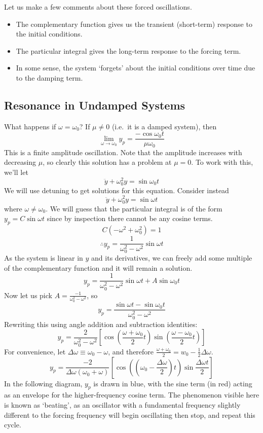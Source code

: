 \noindent Let us make a few comments about these forced oscillations.
\begin{itemize}
	\item The complementary function gives us the transient (short-term) response to the initial conditions.
	\item The particular integral gives the long-term response to the forcing term.
	\item In some sense, the system `forgets' about the initial conditions over time due to the damping term.
\end{itemize}

\subsection{Resonance in Undamped Systems}
What happens if \(\omega = \omega_0\)? If \(\mu \neq 0\) (i.e.\ it is a damped system), then
\[
	\lim_{\omega \to \omega_0} y_p = \frac{-\cos\omega_0 t}{\mu\omega_0}
\]
This is a finite amplitude oscillation.
Note that the amplitude increases with decreasing \(\mu\), so clearly this solution has a problem at \(\mu = 0\).
To work with this, we'll let
\[
	\ddot y + \omega_0^2 y = \sin\omega_0 t
\]
We will use detuning to get solutions for this equation.
Consider instead
\[
	\ddot y + \omega_0^2 y = \sin\omega t
\]
where \(\omega \neq \omega_0\).
We will guess that the particular integral is of the form \(y_p = C\sin\omega t\) since by inspection there cannot be any cosine terms.
\[
	C(-\omega^2 + \omega_0^2) = 1
\]
\[
	\therefore y_p = \frac{1}{\omega_0^2 - \omega^2}\sin\omega t
\]
As the system is linear in \(y\) and its derivatives, we can freely add some multiple of the complementary function and it will remain a solution.
\[
	y_p = \frac{1}{\omega_0^2 - \omega^2}\sin\omega t + A \sin\omega_0 t
\]
Now let us pick \(A = \frac{-1}{\omega_0^2 - \omega^2}\), so
\[
	y_p = \frac{\sin \omega t - \sin \omega_0 t}{\omega_0^2 - \omega^2}
\]
Rewriting this using angle addition and subtraction identities:
\[
	y_p = \frac{2}{\omega_0^2 - \omega^2}\left[ \cos\left( \frac{\omega + \omega_0}{2}t \right) \sin\left( \frac{\omega - \omega_0}{2}t \right) \right]
\]
For convenience, let \(\Delta\omega \equiv \omega_0 - \omega\), and therefore \(\frac{\omega + \omega_0}{2} = w_0 - \frac{1}{2}\Delta\omega\).
\[
	y_p = \frac{-2}{\Delta\omega(\omega_0 + \omega)}\left[ \cos\left( \left(\omega_0 - \frac{\Delta\omega}{2}\right)t \right) \sin\frac{\Delta\omega t}{2} \right]
\]
In the following diagram, \(y_p\) is drawn in blue, with the sine term (in red) acting as an envelope for the higher-frequency cosine term.
The phenomenon visible here is known as `beating', as an oscillator with a fundamental frequency slightly different to the forcing frequency will begin oscillating then stop, and repeat this cycle.\medskip

